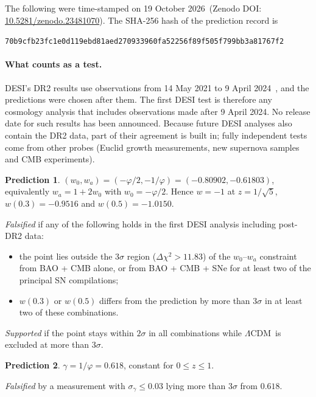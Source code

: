 \documentclass[11pt]{article}
\theoremstyle{definition}
\newtheorem{prediction}{Prediction}
\theoremstyle{remark}
\newcommand{\gr}{\varphi}
\newcommand{\LCDM}{$\Lambda$CDM}
\newcommand{\lockdate}{19 October 2026}
\newcommand{\lockhash}{70b9cfb23fc1e0d119ebd81aed270933960fa52256f89f505f799bb3a81767f2}
\begin{document}
The following were time-stamped on \lockdate\ (Zenodo DOI: \href{https://doi.org/10.5281/zenodo.23481070}{10.5281/zenodo.23481070}). The SHA-256 hash of the prediction record is
\begin{center}\footnotesize\texttt{\lockhash}\end{center}

\paragraph{What counts as a test.} DESI's DR2 results use observations from 14 May 2021 to 9 April 2024~\cite{DESI-DR2}, and the predictions were chosen after them. The first DESI test is therefore any cosmology analysis that includes observations made after 9 April 2024. No release date for such results has been announced. Because future DESI analyses also contain the DR2 data, part of their agreement is built in; fully independent tests come from other probes (Euclid growth measurements, new supernova samples and CMB experiments).

\begin{prediction}\label{pred:de}
$(w_0, w_a) = (-\gr/2, -1/\gr) = (-0.80902, -0.61803)$, equivalently $w_a = 1 + 2w_0$ with $w_0 = -\gr/2$. Hence $w = -1$ at $z = 1/\sqrt5$, $w(0.3) = -0.9516$ and $w(0.5) = -1.0150$.

\emph{Falsified} if any of the following holds in the first DESI analysis including post-DR2 data:
\begin{itemize}
\item the point lies outside the $3\sigma$ region ($\Delta\chi^2 > 11.83$) of the $w_0$--$w_a$ constraint from BAO + CMB alone, or from BAO + CMB + SNe for at least two of the principal SN compilations;
\item $w(0.3)$ or $w(0.5)$ differs from the prediction by more than $3\sigma$ in at least two of these combinations.
\end{itemize}

\emph{Supported} if the point stays within $2\sigma$ in all combinations while \LCDM\ is excluded at more than $3\sigma$.
\end{prediction}

\begin{prediction}\label{pred:gamma}
$\gamma = 1/\gr = 0.618$, constant for $0 \le z \le 1$.

\emph{Falsified} by a measurement with $\sigma_\gamma \le 0.03$ lying more than $3\sigma$ from $0.618$.
\end{prediction}
\end{document}
